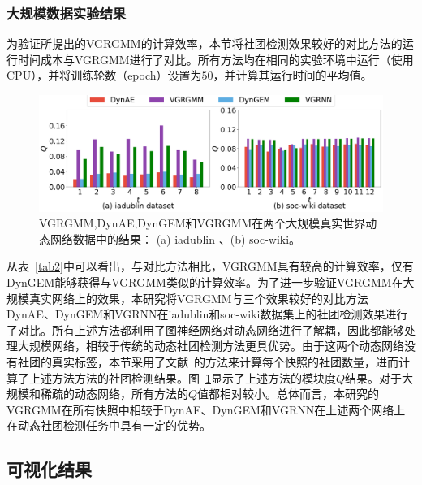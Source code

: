 \subsubsection{大规模数据实验结果}
为验证所提出的VGRGMM的计算效率，本节将社团检测效果较好的对比方法的运行时间成本与VGRGMM进行了对比。所有方法均在相同的实验环境中运行（使用CPU），并将训练轮数（epoch）设置为$50$，并计算其运行时间的平均值。
\begin{figure}
    \centering
    \includegraphics[width=.8\textwidth]{figures/chap06/bigdata-ia-soc.pdf}
    \caption{VGRGMM,DynAE,DynGEM和VGRGMM在两个大规模真实世界动态网络数据中的结果： (a) iadublin 、(b) soc-wiki。}
    \label{fig:iadublin}
\end{figure}


从表~\ref{tab2}中可以看出，与对比方法相比，VGRGMM具有较高的计算效率，仅有DynGEM能够获得与VGRGMM类似的计算效率。为了进一步验证VGRGMM在大规模真实网络上的效果，本研究将VGRGMM与三个效果较好的对比方法DynAE、DynGEM和VGRNN在iadublin和soc-wiki数据集上的社团检测效果进行了对比。所有上述方法都利用了图神经网络对动态网络进行了解耦，因此都能够处理大规模网络，相较于传统的动态社团检测方法更具优势。由于这两个动态网络没有社团的真实标签，本节采用了文献~\cite{Krzakala.2013.Zhang}的方法来计算每个快照的社团数量，进而计算了上述方法方法的社团检测结果。图~\ref{fig:iadublin}显示了上述方法的模块度$Q$结果。对于大规模和稀疏的动态网络，所有方法的$Q$值都相对较小。总体而言，本研究的VGRGMM在所有快照中相较于DynAE、DynGEM和VGRNN在上述两个网络上在动态社团检测任务中具有一定的优势。

%






\subsection{可视化结果}

